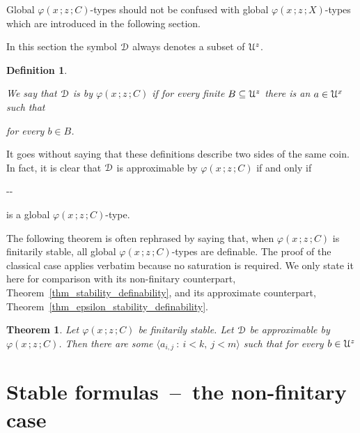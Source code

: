 \documentclass{amsproc}
\newcounter{thm}
\theoremstyle{mio}
\newtheorem{theorem}[thm]{Theorem}\tcolorboxenvironment{theorem}{mythm}
\newtheorem{definition}[thm]{Definition}\tcolorboxenvironment{definition}{mythm}
\renewcommand*{\emph}[1]{%
   \smash{\tikz[baseline]\node[rectangle, fill=teal!25, rounded corners, inner xsep=0.5ex, inner ysep=0.2ex, anchor=base, minimum height = 2.7ex]{\strut #1};}}
\begin{document}
Global $\varphi(x\,;z\,;C)$-types should not be confused with global $\varphi(x\,;z\,;X)$-types which are introduced in the following section.

In this section the symbol ${\EuScript D}$ always denotes a subset of ${\EuScript U}^z$.

\begin{definition}\label{def_approx}\strut
  We say that ${\EuScript D}$ is \emph{approximable\/} by $\varphi(x\,;z\,;C)$ if for every finite $B\subseteq {\EuScript U}^z$ there is an $a\in {\EuScript U}^x$ such that\smallskip

  \hfill for every $b\in B$.
\end{definition}

It goes without saying that these definitions describe two sides of the same coin.
In fact, it is clear that ${\EuScript D}$ is approximable by $\varphi(x\,;z\,;C)$ if and only if  
    
  \noindent\kern-\kern-

is a global $\varphi(x\,;z\,;C)$-type.\smallskip

The following theorem is often rephrased by saying that, when $\varphi(x\,;z\,;C)$ is finitarily stable, all global $\varphi(x\,;z\,;C)$-types are definable.
The proof of the classical case applies verbatim because no saturation is required.
We only state it here for comparison with its non-finitary counterpart, Theorem~\ref{thm_stability_definability}, and its approximate counterpart, Theorem~\ref{thm_epsilon_stability_definability}.

\begin{theorem}
  Let $\varphi(x\,;z\,;C)$ be finitarily stable.
  Let ${\EuScript D}$ be approximable by $\varphi(x\,;z\,;C)$.
  Then there are some $\langle a_{i,j}\ :\ i< k,\ j<m\rangle$ such that for every $b\in{\EuScript U}^z$\medskip

\end{theorem}


\section{Stable formulas~--~the non-finitary case}
\def\medrel#1{\parbox{5ex}{\hfil $#1$}}
\def\ceq#1#2#3{\parbox[t]{22ex}{$\displaystyle #1$}\medrel{#2}{$\displaystyle #3$}}
\end{document}
